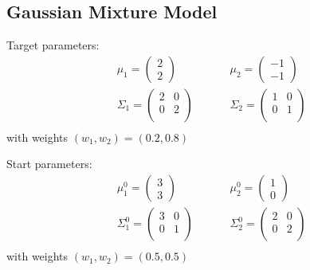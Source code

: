 \subsection{Gaussian Mixture Model}
Target parameters:
\[
\begin{aligned}
	&\mu_1 = \begin{pmatrix} 2 \\ 2 \end{pmatrix}  &\hspace{20pt}  &\mu_2 = \begin{pmatrix} -1 \\ -1 \end{pmatrix} \\
	&\Sigma_1 = 
	\begin{pmatrix}
		2 & 0 \\
		0 & 2 \\
	\end{pmatrix} 
	&\hspace{20pt}
	&\Sigma_2 = 
	\begin{pmatrix}
		1 & 0 \\
		0 & 1 \\
	\end{pmatrix} \\
\end{aligned}
\]
with weights $(w_1, w_2) = ( 0.2, 0.8 )$

Start parameters:
\[
\begin{aligned}
	&\mu_1^0 = \begin{pmatrix} 3 \\ 3 \end{pmatrix}  &\hspace{20pt}  &\mu_2^0 = \begin{pmatrix} 1 \\ 0 \end{pmatrix} \\
	&\Sigma_1^0 = 
	\begin{pmatrix}
		3 & 0 \\
		0 & 1 \\
	\end{pmatrix} 
	&\hspace{20pt}
	&\Sigma_2^0 = 
	\begin{pmatrix}
		2 & 0 \\
		0 & 2 \\
	\end{pmatrix} \\
\end{aligned}
\]
with weights $(w_1, w_2) = ( 0.5, 0.5 )$





